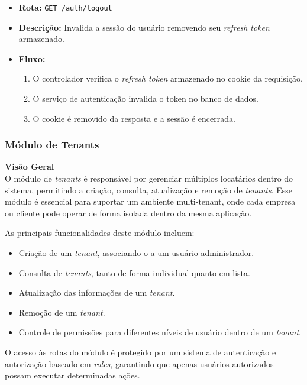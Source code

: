 \begin{itemize}
	\item \textbf{Rota:} \texttt{GET /auth/logout}
	\item \textbf{Descrição:} Invalida a sessão do usuário removendo seu \textit{refresh token} armazenado.
	\item \textbf{Fluxo:}
	\begin{enumerate}
		\item O controlador verifica o \textit{refresh token} armazenado no cookie da requisição.
		\item O serviço de autenticação invalida o token no banco de dados.
		\item O cookie é removido da resposta e a sessão é encerrada.
	\end{enumerate}
\end{itemize}

\subsubsection{Módulo de Tenants}\label{subsubsec:modulo_tenants}

\noindent\textbf{Visão Geral} \\
O módulo de \textit{tenants} é responsável por gerenciar múltiplos locatários dentro do sistema, permitindo a criação, consulta, atualização e remoção de \textit{tenants}. Esse módulo é essencial para suportar um ambiente multi-tenant, onde cada empresa ou cliente pode operar de forma isolada dentro da mesma aplicação.

As principais funcionalidades deste módulo incluem:

\begin{itemize}
    \item Criação de um \textit{tenant}, associando-o a um usuário administrador.
    \item Consulta de \textit{tenants}, tanto de forma individual quanto em lista.
    \item Atualização das informações de um \textit{tenant}.
    \item Remoção de um \textit{tenant}.
    \item Controle de permissões para diferentes níveis de usuário dentro de um \textit{tenant}.
\end{itemize}

O acesso às rotas do módulo é protegido por um sistema de autenticação e autorização baseado em \textit{roles}, garantindo que apenas usuários autorizados possam executar determinadas ações.

